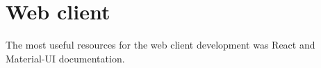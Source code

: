 
\section{Web client}\label{sec:web-client}

The most useful resources for the web client development was React and Material-UI documentation.\cite{react, material}

